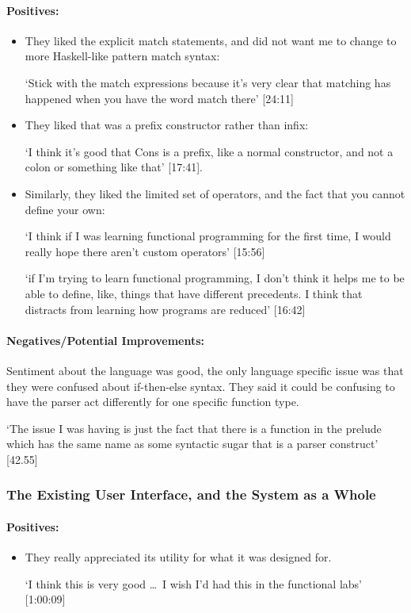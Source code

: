 \paragraph{Positives:}
\begin{itemize}
    \item They liked the explicit match statements, and did not want me to change to more Haskell-like pattern match syntax: 
    
    `Stick with the match expressions because it's very clear that matching has happened when you have the word match there' [24:11]
    \item They liked that  was a prefix constructor rather than infix: 
    
    `I think it's good that Cons is a prefix, like a normal constructor, and not a colon or
    something like that' [17:41]. 
    \item Similarly, they liked the limited set of operators, and the fact that you cannot define your own: 
    
    `I think if I was learning functional programming for the first time, I would really hope there aren't custom operators' [15:56]
    
    `if I'm trying to learn functional programming, I don't think it helps me to be able to define, like, things that have different precedents. I think that distracts from learning how programs are reduced' [16:42]
\end{itemize}

\paragraph{Negatives/Potential Improvements:}
\label{ref:afg_ite} 
Sentiment about the language was good, the only language specific issue was that they were confused about if-then-else syntax. They said it could be confusing to have the parser act differently for one specific function type. 

`The issue I was having is just the fact that there is a function in the prelude which has the same name as some syntactic sugar that is a parser construct' [42.55]

\subsubsection{The Existing User Interface, and the System as a Whole}
\paragraph{Positives:}
\begin{itemize}
    \item They really appreciated its utility for what it was designed for. 
    
    `I think this is very good \ldots\ I wish I'd had this in the functional labs' [1:00:09]
\end{itemize}

